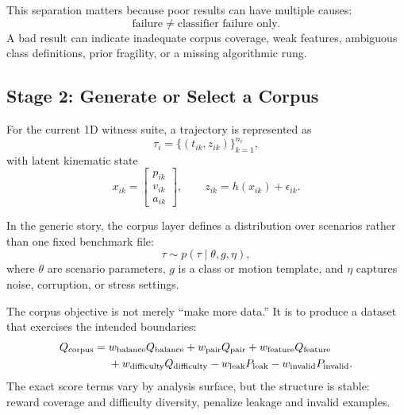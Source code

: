 \documentclass[11pt]{article}
\begin{document}
This separation matters because poor results can have multiple causes:
\begin{equation}
\text{failure} \neq \text{classifier failure only}.
\end{equation}
A bad result can indicate inadequate corpus coverage, weak features, ambiguous class definitions, prior fragility, or a missing algorithmic rung.

\subsection{Stage 2: Generate or Select a Corpus}
For the current 1D witness suite, a trajectory is represented as
\begin{equation}
\tau_i = \{(t_{ik}, z_{ik})\}_{k=1}^{n_i},
\end{equation}
with latent kinematic state
\begin{equation}
x_{ik} =
\begin{bmatrix}
p_{ik} \\
v_{ik} \\
a_{ik}
\end{bmatrix},
\qquad
z_{ik} = h(x_{ik}) + \epsilon_{ik}.
\end{equation}

In the generic story, the corpus layer defines a distribution over scenarios rather than one fixed benchmark file:
\begin{equation}
\tau \sim p(\tau \mid \theta, g, \eta),
\end{equation}
where \(\theta\) are scenario parameters, \(g\) is a class or motion template, and \(\eta\) captures noise, corruption, or stress settings.

The corpus objective is not merely ``make more data.'' It is to produce a dataset that exercises the intended boundaries:
\begin{align}
Q_{\text{corpus}}
=\;&
w_{\text{balance}} Q_{\text{balance}}
+ w_{\text{pair}} Q_{\text{pair}}
+ w_{\text{feature}} Q_{\text{feature}}
\notag \\
&+ w_{\text{difficulty}} Q_{\text{difficulty}}
- w_{\text{leak}} P_{\text{leak}}
- w_{\text{invalid}} P_{\text{invalid}}.
\end{align}
The exact score terms vary by analysis surface, but the structure is stable: reward coverage and difficulty diversity, penalize leakage and invalid examples.
\end{document}
